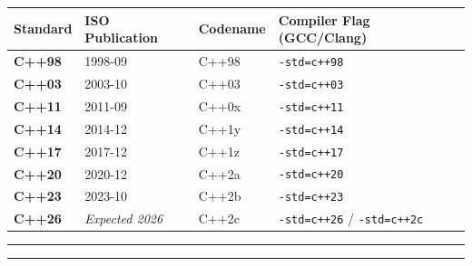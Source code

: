 \begin{longtable}[]{@{}llll@{}}
\toprule
Standard & ISO Publication & Codename & Compiler Flag (GCC/Clang) \\
\midrule
\endhead
\textbf{C++98} & 1998-09 & C++98 &
\passthrough{\lstinline!-std=c++98!} \\
\textbf{C++03} & 2003-10 & C++03 &
\passthrough{\lstinline!-std=c++03!} \\
\textbf{C++11} & 2011-09 & C++0x &
\passthrough{\lstinline!-std=c++11!} \\
\textbf{C++14} & 2014-12 & C++1y &
\passthrough{\lstinline!-std=c++14!} \\
\textbf{C++17} & 2017-12 & C++1z &
\passthrough{\lstinline!-std=c++17!} \\
\textbf{C++20} & 2020-12 & C++2a &
\passthrough{\lstinline!-std=c++20!} \\
\textbf{C++23} & 2023-10 & C++2b &
\passthrough{\lstinline!-std=c++23!} \\
\textbf{C++26} & \emph{Expected 2026} & C++2c &
\passthrough{\lstinline!-std=c++26!} /
\passthrough{\lstinline!-std=c++2c!} \\
\bottomrule
\end{longtable}

\begin{center}\rule{0.5\linewidth}{0.5pt}\end{center}

\begin{center}\rule{0.5\linewidth}{0.5pt}\end{center}
